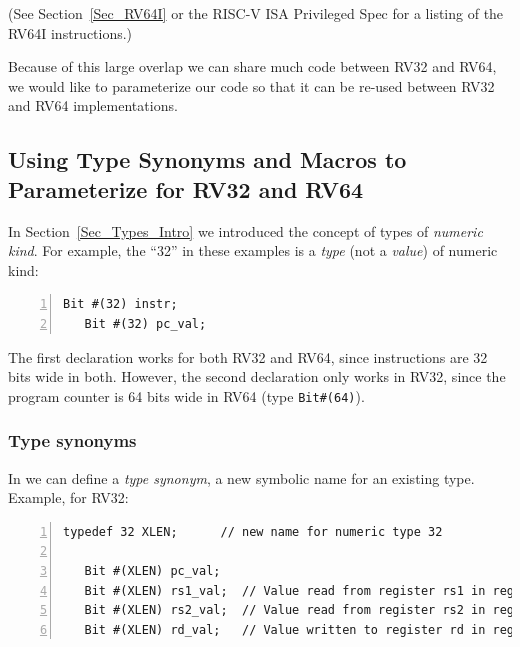 (See Section~\ref{Sec_RV64I} or the RISC-V ISA Privileged Spec for a
listing of the RV64I instructions.)

Because of this large overlap we can share much {\BSV} code between
RV32 and RV64, {\ie} we would like to parameterize our {\BSV} code so
that it can be re-used between RV32 and RV64 implementations.


\subsection{Using Type Synonyms and Macros to Parameterize for RV32 and RV64}

\label{Sec_Type_Synonums_and_Macros}


In Section~\ref{Sec_Types_Intro} we introduced the concept of types of
\emph{numeric kind}. For example, the ``32'' in these examples is a
\emph{type} (not a \emph{value}) of numeric kind:

{\footnotesize
\begin{Verbatim}[frame=single, numbers=left]
   Bit #(32) instr;
   Bit #(32) pc_val;
\end{Verbatim}
}

The first declaration works for both RV32 and RV64, since instructions
are 32 bits wide in both.  However, the second declaration only works
in RV32, since the program counter is 64 bits wide in RV64 (type
\verb|Bit#(64)|).


\subsubsection{Type synonyms}


In {\BSV} we can define a \emph{type synonym}, a new symbolic name for
an existing type. Example, for RV32:

{\footnotesize
\begin{Verbatim}[frame=single, numbers=left]
   typedef 32 XLEN;      // new name for numeric type 32

   Bit #(XLEN) pc_val;
   Bit #(XLEN) rs1_val;  // Value read from register rs1 in register file
   Bit #(XLEN) rs2_val;  // Value read from register rs2 in register file
   Bit #(XLEN) rd_val;   // Value written to register rd in register file
\end{Verbatim}
}

